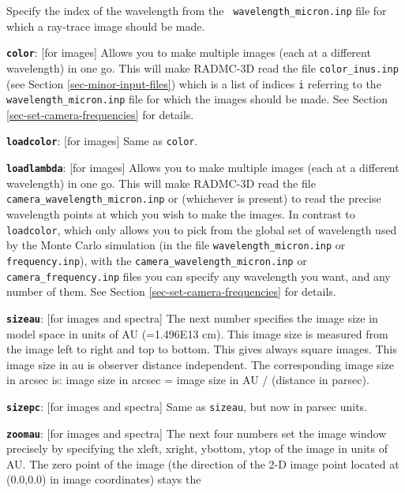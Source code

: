 \documentclass{report}
\newenvironment{options}%
  {\begin{list}{}{%
    \setlength{\topsep}{1em}%
    \setlength{\parskip}{0em}%
    \setlength{\parsep}{0em}%
    \setlength{\itemsep}{1em}%
    \setlength{\rightmargin}{0em}%
    \setlength{\leftmargin}{9em}%
    \setlength{\labelsep}{1em}%
    \setlength{\labelwidth}{6em}%
    \setlength{\itemindent}{0em}}\normalfont}%
  {\end{list}}
\begin{document}
\begin{options}
  Specify the index of the wavelength from the {\small\tt
    wavelength\_micron.inp} file for which a ray-trace image should be made.
\item[{\small\tt\bf color}:\hfill] [for images] Allows you to make multiple
  images (each at a different wavelength) in one go. This will make RADMC-3D
  read the file {\small\tt color\_inus.inp} (see Section
  \ref{sec-minor-input-files}) which is a list of indices {\small\tt i}
  referring to the {\small\tt wavelength\_micron.inp} file for which the
  images should be made. See Section \ref{sec-set-camera-frequencies} for
  details.
\item[{\small\tt\bf loadcolor}:\hfill] [for images] Same as {\small\tt color}.
\item[{\small\tt\bf loadlambda}:\hfill] [for images] Allows you to make
  multiple images (each at a different wavelength) in one go. This will make
  RADMC-3D read the file {\small\tt camera\_wavelength\_micron.inp} or
   (whichever is present) to read the
  precise wavelength points at which you wish to make the images. In
  contrast to {\small\tt loadcolor}, which only allows you to pick from the
  global set of wavelength used by the Monte Carlo simulation (in the file
  {\small\tt wavelength\_micron.inp} or {\small\tt frequency.inp}), with the
  {\small\tt camera\_wavelength\_micron.inp} or {\small\tt
    camera\_frequency.inp} files you can specify any wavelength you want,
  and any number of them. See Section \ref{sec-set-camera-frequencies} for
  details.
\item[{\small\tt\bf sizeau}:\hfill] [for images and spectra] The next number
  specifies the image size in model space in units of AU (=1.496E13
  cm). This image size is measured from the image left to
  right and top to bottom. This gives always square images. This image 
  size in au is observer distance independent. The corresponding image 
  size in arcsec is: image size in arcsec = image size in AU /
  (distance in parsec).
\item[{\small\tt\bf sizepc}:\hfill] [for images and spectra] Same as {\small\tt sizeau}, but
  now in parsec units.
\item[{\small\tt\bf zoomau}:\hfill] [for images and spectra] The next four numbers set
  the image window precisely by specifying the xleft, xright, ybottom, ytop
  of the image in units of AU. The zero point of the image (the direction of
  the 2-D image point located at (0.0,0.0) in image coordinates) stays the

\end{options}
\end{document}

